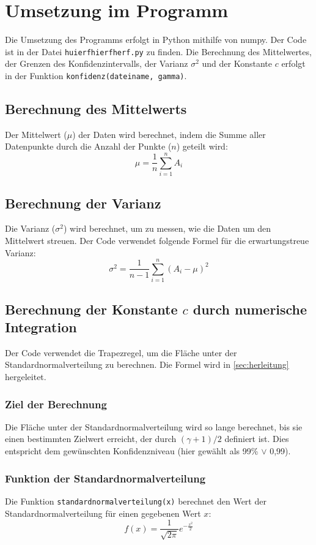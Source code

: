 \section{Umsetzung im Programm}
\label{sec:umsetzung_im_programm}
Die Umsetzung des Programms erfolgt in Python mithilfe von numpy. Der Code ist in der Datei \texttt{huierfhierfherf.py} zu finden. Die Berechnung des Mittelwertes, der Grenzen des Konfidenzintervalls, der Varianz $\sigma^2$ und der Konstante $c$ erfolgt in der Funktion \texttt{konfidenz(dateiname, gamma)}.
\subsection{Berechnung des Mittelwerts}
Der Mittelwert (\(\mu\)) der Daten wird berechnet, indem die Summe aller Datenpunkte durch die Anzahl der Punkte (\(n\)) geteilt wird:
\[
\mu = \frac{1}{n} \sum_{i=1}^{n} A_i
\]

\subsection{Berechnung der Varianz}
Die Varianz (\(\sigma^2\)) wird berechnet, um zu messen, wie die Daten um den Mittelwert streuen. Der Code verwendet folgende Formel für die erwartungstreue Varianz:
\[
\sigma^2 = \frac{1}{n-1} \sum_{i=1}^{n} (A_i - \mu)^2
\]

\subsection{Berechnung der Konstante \(c\) durch numerische Integration}
Der Code verwendet die Trapezregel, um die Fläche unter der Standardnormalverteilung zu berechnen. Die Formel wird in \autoref{sec:herleitung} hergeleitet.

\subsubsection{Ziel der Berechnung}
Die Fläche unter der Standardnormalverteilung wird so lange berechnet, bis sie einen bestimmten Zielwert erreicht, der durch \((\gamma + 1) / 2\) definiert ist. Dies entspricht dem gewünschten Konfidenzniveau (hier gewählt als 99\% $\vee$ 0,99).

\subsubsection{Funktion der Standardnormalverteilung}
Die Funktion \texttt{standardnormalverteilung(x)} berechnet den Wert der Standardnormalverteilung für einen gegebenen Wert \(x\):
\[
f(x) = \frac{1}{\sqrt{2\pi}} e^{-\frac{x^2}{2}}
\]

